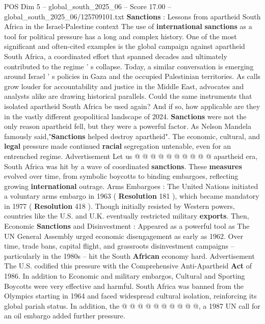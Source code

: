 \begin{textsample}{POS Dim 5 – global\_south\_2025\_06 – Score 17.00 – global\_south\_2025\_06/125709101.txt}  \label{ex:f5_pos_045}
\textbf{Sanctions} : Lessons from apartheid South Africa in the Israel-Palestine context The use of \textbf{international} \textbf{sanctions} as a tool for political pressure has a long and complex history.
One of the most significant and often-cited examples is the global campaign against apartheid South Africa, a coordinated effort that spanned decades and ultimately contributed to the regime ' s collapse.
Today, a similar conversation is emerging around Israel ' s policies in Gaza and the occupied Palestinian territories.
As calls grow louder for accountability and justice in the Middle East, advocates and analysts alike are drawing historical parallels.
Could the same instruments that isolated apartheid South Africa be used again?
And if so, how applicable are they in the vastly different geopolitical landscape of 2024. \textbf{Sanctions} were not the only reason apartheid fell, but they were a powerful factor.
As Nelson Mandela famously said,"\textbf{Sanctions} helped destroy apartheid".
The economic, cultural, and \textbf{legal} pressure made continued \textbf{racial} segregation untenable, even for an entrenched regime.
Advertisement Let us @ @ @ @ @ @ @ @ @ @ apartheid era, South Africa was hit by a wave of coordinated \textbf{sanctions}.
These \textbf{measures} evolved over time, from symbolic boycotts to binding embargoes, reflecting growing \textbf{international} outrage.
Arms Embargoes : The United Nations initiated a voluntary arms embargo in 1963 ( \textbf{Resolution} 181 ), which became mandatory in 1977 ( \textbf{Resolution} 418 ).
Though initially resisted by Western powers, countries like the U.S. and U.K. eventually restricted military \textbf{exports}.
Then, Economic \textbf{Sanctions} and Disinvestment : Appeared as a powerful tool as The UN General Assembly urged economic disengagement as early as 1962.
Over time, trade bans, capital flight, and grassroots disinvestment campaigns -- particularly in the 1980s -- hit the South \textbf{African} economy hard.
Advertisement The U.S. codified this pressure with the Comprehensive Anti-Apartheid \textbf{Act} of 1986.
In addition to Economic and military embargos, Cultural and Sporting Boycotts were very effective and harmful.
South Africa was banned from the Olympics starting in 1964 and faced widespread cultural isolation, reinforcing its global pariah status.
In addition, the @ @ @ @ @ @ @ @ @ @, a 1987 UN call for an oil embargo added further pressure.

\end{textsample}
